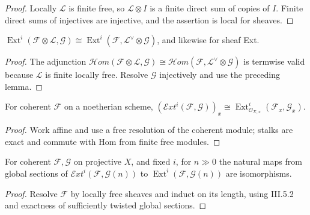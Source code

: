 \begin{proof}

Locally $\mathcal L$ is finite free, so $\mathcal L\otimes I$ is a finite direct sum of copies of
$I$.  Finite direct sums of injectives are injective, and the assertion is local for sheaves.

\end{proof}
\begin{proposition}\label{ha-ch3-prop-ext-tensor}
$\operatorname{Ext}^i(\mathcal F\otimes\mathcal L,\mathcal G)\cong
\operatorname{Ext}^i(\mathcal F,\mathcal L^\vee\otimes\mathcal G)$, and likewise for sheaf Ext.

\end{proposition}
\begin{proof}

The adjunction $\mathcal H om(\mathcal F\otimes\mathcal L,\mathcal G)
\cong\mathcal H om(\mathcal F,\mathcal L^\vee\otimes\mathcal G)$ is termwise valid because
$\mathcal L$ is finite locally free.  Resolve $\mathcal G$ injectively and use the preceding lemma.

\end{proof}
\begin{proposition}\label{ha-ch3-prop-ext-stalk}
For coherent $\mathcal F$ on a noetherian scheme,
$(\mathcal E xt^i(\mathcal F,\mathcal G))_x\cong
\operatorname{Ext}^i_{\mathcal O_{X,x}}(\mathcal F_x,\mathcal G_x)$.

\end{proposition}
\begin{proof}
Work affine and use a free resolution of the coherent module;
stalks are exact and commute with Hom from finite free modules.
\end{proof}
\begin{proposition}\label{ha-ch3-prop-ext-twist}
For coherent $\mathcal F,\mathcal G$ on projective $X$, and fixed $i$, for
$n\gg0$ the natural maps from global sections of $\mathcal E xt^i(\mathcal F,\mathcal G(n))$
to $\operatorname{Ext}^i(\mathcal F,\mathcal G(n))$ are isomorphisms.

\end{proposition}
\begin{proof}
Resolve $\mathcal F$ by locally free sheaves and induct on its
length, using III.5.2 and exactness of sufficiently twisted global sections.
\end{proof}
